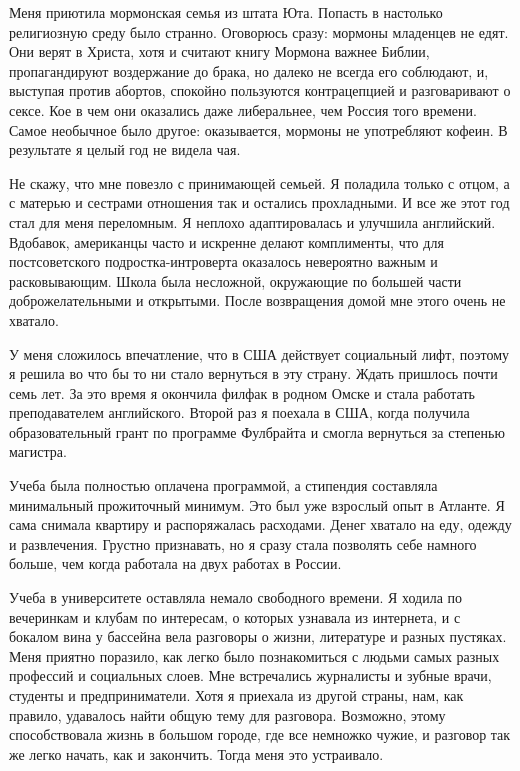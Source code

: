 Меня приютила мормонская семья из штата Юта. Попасть в настолько религиозную среду было странно. Оговорюсь сразу: мормоны младенцев не едят. Они верят в Христа, хотя и считают книгу Мормона важнее Библии, пропагандируют воздержание до брака, но далеко не всегда его соблюдают, и, выступая против абортов, спокойно пользуются контрацепцией и разговаривают о сексе. Кое в чем они оказались даже либеральнее, чем Россия того времени. Самое необычное было другое: оказывается, мормоны не употребляют кофеин. В результате я целый год не видела чая.

Не скажу, что мне повезло с принимающей семьей. Я поладила только с отцом, а с матерью и сестрами отношения так и остались прохладными. И все же этот год стал для меня переломным. Я неплохо адаптировалась и улучшила английский. Вдобавок, американцы часто и искренне делают комплименты, что для постсоветского подростка-интроверта оказалось невероятно важным и расковывающим. Школа была несложной, окружающие по большей части доброжелательными и открытыми. После возвращения домой мне этого очень не хватало.

У меня сложилось впечатление, что в США действует социальный лифт, поэтому я решила во что бы то ни стало вернуться в эту страну. Ждать пришлось почти семь лет. За это время я окончила филфак в родном Омске и стала работать преподавателем английского. Второй раз я поехала в США, когда получила образовательный грант по программе Фулбрайта и смогла вернуться за степенью магистра.

Учеба была полностью оплачена программой, а стипендия составляла минимальный прожиточный минимум. Это был уже взрослый опыт в Атланте. Я сама снимала квартиру и распоряжалась расходами. Денег хватало на еду, одежду и развлечения. Грустно признавать, но я сразу стала позволять себе намного больше, чем когда работала на двух работах в России.

Учеба в университете оставляла немало свободного времени. Я ходила по вечеринкам и клубам по интересам, о которых узнавала из интернета, и с бокалом вина у бассейна вела разговоры о жизни, литературе и разных пустяках. Меня приятно поразило, как легко было познакомиться с людьми самых разных профессий и социальных слоев. Мне встречались журналисты и зубные врачи, студенты и предприниматели. Хотя я приехала из другой страны, нам, как правило, удавалось найти общую тему для разговора. Возможно, этому способствовала жизнь в большом городе, где все немножко чужие, и разговор так же легко начать, как и закончить. Тогда меня это устраивало.

